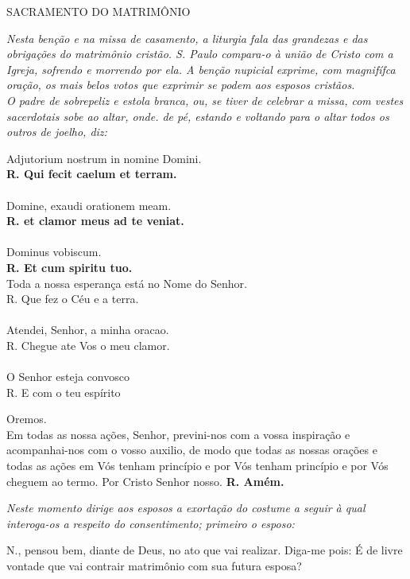 \begin{center}
	SACRAMENTO DO MATRIMÔNIO
\end{center}

\textit{Nesta benção e na missa de casamento, a liturgia fala das grandezas e das obrigações do matrimônio cristão. S. Paulo compara-o à união de Cristo com a Igreja, sofrendo e morrendo por ela. A benção nupicial exprime, com magnifífca oração, os mais belos votos que exprimir se podem aos esposos cristãos.
\\O padre de sobrepeliz e estola branca, ou, se tiver de celebrar a missa, com vestes sacerdotais sobe ao altar, onde. de pé, estando e voltando para o altar todos os outros de joelho, diz:}

\begin{multicols}{2}
\noindent
Adjutorium nostrum in nomine Domini.
\\\textbf{R. Qui fecit caelum et terram.}
\\
\\Domine, exaudi orationem meam.
\\\textbf{R. et clamor meus ad te veniat.}
\\
\\Dominus vobiscum.
\\\textbf{R. Et cum spiritu tuo.}
\\Toda a nossa esperança está no Nome do Senhor.
\\R. Que fez o Céu e a terra. 
\\
\\Atendei, Senhor, a minha oracao.
\\R. Chegue ate Vos o meu clamor.
\\
\\O Senhor esteja convosco
\\R. E com o teu espírito
\end{multicols}
\noindent
Oremos.
\\Em todas as nossa ações, Senhor, previni-nos com a vossa inspiração e acompanhai-nos com o vosso auxilio, de modo que todas as nossas orações e todas as ações em Vós tenham princípio e por Vós tenham princípio e por Vós cheguem ao termo. Por Cristo Senhor nosso. \textbf{R. Amém.}
\begin{center}
	\textit{Neste momento dirige aos esposos a exortação do costume a seguir à qual interoga-os a respeito do consentimento; primeiro o esposo:}
\end{center}
N., pensou bem, diante de Deus, no ato que vai realizar. Diga-me pois: É de livre vontade que vai contrair matrimônio com sua futura esposa?

